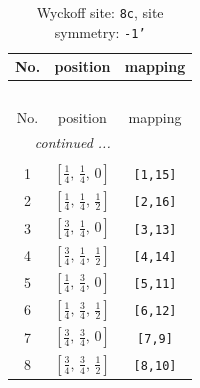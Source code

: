 \documentclass[fleqn,8pt]{jsarticle}
\begin{document}
\renewcommand{\arraystretch}{1.2}
\begin{longtable}{ccc}
\caption{Wyckoff site: {\tt 8c}, site symmetry: {\tt -1'}}
 \\
 \hline \hline
No. & position & mapping \\ \hline \endfirsthead

\multicolumn{2}{l}{\tablename\ \thetable{}} \\
 \hline \hline
No. & position & mapping \\ \hline \endhead

 \hline \hline
\multicolumn{2}{r}{\footnotesize\it continued ...} \\ \endfoot

 \hline \hline
\multicolumn{2}{r}{} \\ \endlastfoot

1 & $\left[ \frac{1}{4},\, \frac{1}{4},\, 0 \right]$ & {\tt [1,15]} \\ \hline
2 & $\left[ \frac{1}{4},\, \frac{1}{4},\, \frac{1}{2} \right]$ & {\tt [2,16]} \\ \hline
3 & $\left[ \frac{3}{4},\, \frac{1}{4},\, 0 \right]$ & {\tt [3,13]} \\ \hline
4 & $\left[ \frac{3}{4},\, \frac{1}{4},\, \frac{1}{2} \right]$ & {\tt [4,14]} \\ \hline
5 & $\left[ \frac{1}{4},\, \frac{3}{4},\, 0 \right]$ & {\tt [5,11]} \\ \hline
6 & $\left[ \frac{1}{4},\, \frac{3}{4},\, \frac{1}{2} \right]$ & {\tt [6,12]} \\ \hline
7 & $\left[ \frac{3}{4},\, \frac{3}{4},\, 0 \right]$ & {\tt [7,9]} \\ \hline
8 & $\left[ \frac{3}{4},\, \frac{3}{4},\, \frac{1}{2} \right]$ & {\tt [8,10]} \\
\end{longtable}
\renewcommand{\arraystretch}{1.2}
\end{document}
